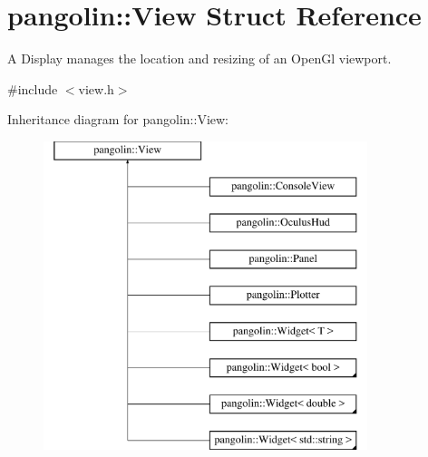 \hypertarget{structpangolin_1_1_view}{}\section{pangolin\+:\+:View Struct Reference}
\label{structpangolin_1_1_view}


A Display manages the location and resizing of an Open\+Gl viewport.  




{\ttfamily \#include $<$view.\+h$>$}

Inheritance diagram for pangolin\+:\+:View\+:\begin{figure}[H]
\begin{center}
\leavevmode
\includegraphics[height=9.000000cm]{structpangolin_1_1_view}
\end{center}
\end{figure}
